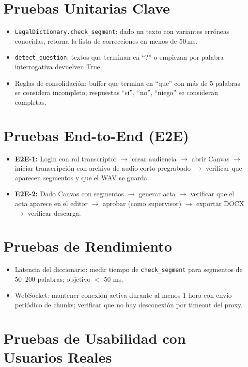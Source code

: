 \documentclass[12pt,a4paper]{report}
\begin{document}
\section{Pruebas Unitarias Clave}

\begin{itemize}
    \item \texttt{LegalDictionary.check\_segment}: dado un texto con variantes erróneas conocidas, retorna la lista de correcciones en menos de 50\,ms.
    \item \texttt{detect\_question}: textos que terminan en ``?'' o empiezan por palabra interrogativa devuelven True.
    \item Reglas de consolidación: buffer que termina en ``que'' con más de 5 palabras se considera incompleto; respuestas ``sí'', ``no'', ``niego'' se consideran completas.
\end{itemize}

\section{Pruebas End-to-End (E2E)}

\begin{itemize}
    \item \textbf{E2E-1:} Login con rol transcriptor $\to$ crear audiencia $\to$ abrir Canvas $\to$ iniciar transcripción con archivo de audio corto pregrabado $\to$ verificar que aparecen segmentos y que el WAV se guarda.
    \item \textbf{E2E-2:} Dado Canvas con segmentos $\to$ generar acta $\to$ verificar que el acta aparece en el editor $\to$ aprobar (como supervisor) $\to$ exportar DOCX $\to$ verificar descarga.
\end{itemize}

\section{Pruebas de Rendimiento}

\begin{itemize}
    \item Latencia del diccionario: medir tiempo de \texttt{check\_segment} para segmentos de 50--200 palabras; objetivo $<$ 50 ms.
    \item WebSocket: mantener conexión activa durante al menos 1 hora con envío periódico de chunks; verificar que no hay desconexión por timeout del proxy.
\end{itemize}

\section{Pruebas de Usabilidad con Usuarios Reales}
\end{document}
